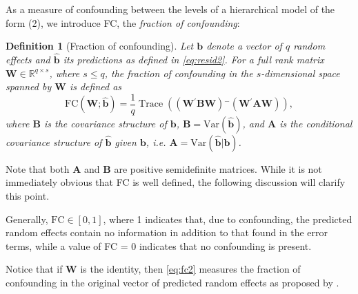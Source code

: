 \documentclass[12pt]{article} %
\newcommand{\hh}[1]{{\color{orange} #1}}
\newcommand{\al}[1]{{\color{red} #1}}
\newtheorem{definition}{Definition}
\newcommand{\ginv}{\ensuremath{^{-}}}
\newcommand{\trans}{\ensuremath{^\prime}}
\newcommand{\var}{\ensuremath{\mathrm{Var}}}
\DeclareMathOperator{\tr}{Trace}
\begin{document}
\hh{As a measure of confounding between the levels of a hierarchical model of the form (2), we introduce FC, the {\it fraction of confounding}:}
\al{
\begin{definition}[Fraction of confounding] 
Let $\bm{b}$ denote a vector of $q$ random effects and $\widehat{\bm{b}}$ its predictions as defined in \eqref{eq:resid2}. For a full rank matrix $\bm{W} \in \mathbb{R}^{q \times s}$, where $ s \le q$, the fraction of confounding in the $s$-dimensional space spanned by $\bm{W}$ is defined as 
\begin{equation}\label{eq:fc2}
\text{FC}(\bm{W}; \widehat{\bm{b}}) = \frac{1}{q} \tr\left( \left(\bm{W\trans B W} \right)\ginv \left(\bm{W\trans A W}\right) \right),
\end{equation}
where $\bm{B}$ is the covariance structure of $\bm b$, $\bm{B} = \var(\widehat{\bm{b}})$, and $\bm{A}$ is the conditional covariance structure of  $\widehat{\bm{b}}$ given $\bm{b}$,  i.e. $\bm{A} = \var(\widehat{\bm{b}} | \bm{b} )$.
\end{definition}
\noindent
Note that both $\bm{A}$ and $\bm{B}$ are  positive semidefinite matrices. While it is not immediately obvious that FC %
is well defined,  the following discussion will clarify this point. %

Generally, $\text{FC} \in [0,1]$, where 1 indicates that, due to confounding, the predicted random effects contain no information in addition to that found in the error terms, while a value of FC = 0 indicates that no confounding is present. 

Notice that if $\bm{W}$ is the identity, then \eqref{eq:fc2} measures the fraction of confounding in the original vector of predicted random effects as proposed by  \cite{HildenMinton:1995wh}.

%


}
\end{document}

